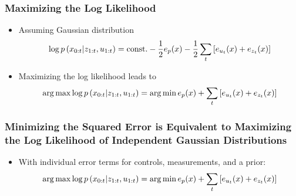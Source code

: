 \begin{frame}
    \frametitle{Maximizing the Log Likelihood}
    
    \begin{itemize}
        \item Assuming Gaussian distribution
        \begin{equation*}
            \log p\left( x_{0:t} | z_{1:t}, u_{1:t} \right) = \text{const.} - \dfrac{1}{2} e_{p}(x) -  \dfrac{1}{2} \sum_{t} \left[ e_{u_{t}}(x) + e_{z_{t}}(x)\right]
        \end{equation*}
        \item Maximizing the log likelihood leads to 
        \begin{equation*}
            \operatorname*{arg\,max} \log p\left( x_{0:t} | z_{1:t}, u_{1:t} \right) = \operatorname*{arg\,min} e_{p}(x) + \sum_{t} \left[ e_{u_{t}}(x) + e_{z_{t}}(x)\right]
        \end{equation*}
    \end{itemize}
    
    
\end{frame}

\begin{frame}
    \frametitle{Minimizing the Squared Error is Equivalent to Maximizing the Log Likelihood of Independent Gaussian Distributions}
    \begin{itemize}
        \item With individual error terms for controls, measurements, and a prior:
        \begin{equation*}
            \operatorname*{arg\,max} \log p\left( x_{0:t} | z_{1:t}, u_{1:t} \right) = \operatorname*{arg\,min} e_{p}(x) + \sum_{t} \left[ e_{u_{t}}(x) + e_{z_{t}}(x)\right]
        \end{equation*}
    \end{itemize}
    
\end{frame}

